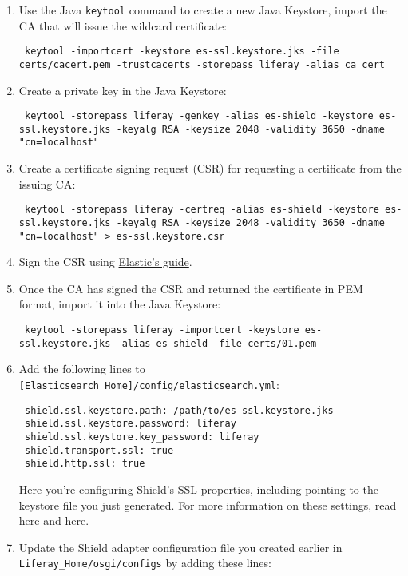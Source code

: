 \begin{enumerate}
\def\labelenumi{\arabic{enumi}.}
\setcounter{enumi}{2}
\item
  Use the Java \texttt{keytool} command to create a new Java Keystore,
  import the CA that will issue the wildcard certificate:

\begin{verbatim}
 keytool -importcert -keystore es-ssl.keystore.jks -file certs/cacert.pem -trustcacerts -storepass liferay -alias ca_cert
\end{verbatim}
\item
  Create a private key in the Java Keystore:

\begin{verbatim}
 keytool -storepass liferay -genkey -alias es-shield -keystore es-ssl.keystore.jks -keyalg RSA -keysize 2048 -validity 3650 -dname "cn=localhost"
\end{verbatim}
\item
  Create a certificate signing request (CSR) for requesting a
  certificate from the issuing CA:

\begin{verbatim}
 keytool -storepass liferay -certreq -alias es-shield -keystore es-ssl.keystore.jks -keyalg RSA -keysize 2048 -validity 3650 -dname "cn=localhost" > es-ssl.keystore.csr
\end{verbatim}
\item
  Sign the CSR using
  \href{https://www.elastic.co/guide/en/shield/2.4/certificate-authority.html\#sign-csr}{Elastic's
  guide}.
\item
  Once the CA has signed the CSR and returned the certificate in PEM
  format, import it into the Java Keystore:

\begin{verbatim}
 keytool -storepass liferay -importcert -keystore es-ssl.keystore.jks -alias es-shield -file certs/01.pem
\end{verbatim}
\item
  Add the following lines to
  \texttt{{[}Elasticsearch\_Home{]}/config/elasticsearch.yml}:

\begin{verbatim}
 shield.ssl.keystore.path: /path/to/es-ssl.keystore.jks
 shield.ssl.keystore.password: liferay
 shield.ssl.keystore.key_password: liferay
 shield.transport.ssl: true
 shield.http.ssl: true
\end{verbatim}

  Here you're configuring Shield's SSL properties, including pointing to
  the keystore file you just generated. For more information on these
  settings, read
  \href{https://www.elastic.co/guide/en/shield/2.4/ssl-tls.html}{here}
  and
  \href{https://www.elastic.co/guide/en/shield/2.4/shield-settings.html}{here}.
\item
  Update the Shield adapter configuration file you created earlier in
  \texttt{Liferay\_Home/osgi/configs} by adding these lines:


\end{enumerate}

